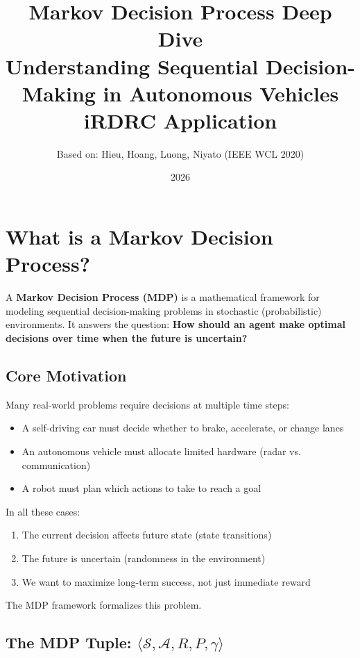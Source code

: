 \documentclass[12pt,a4paper]{article}
\title{\textbf{Markov Decision Process Deep Dive}\\
\large Understanding Sequential Decision-Making in Autonomous Vehicles\\
\normalsize iRDRC Application}
\author{Based on: Hieu, Hoang, Luong, Niyato (IEEE WCL 2020)}
\date{2026}
\begin{document}
\maketitle
\setcounter{tocdepth}{1}
\tableofcontents
\newpage

\section{What is a Markov Decision Process?}

A \textbf{Markov Decision Process (MDP)} is a mathematical framework for modeling sequential decision-making problems in stochastic (probabilistic) environments. It answers the question: \textbf{How should an agent make optimal decisions over time when the future is uncertain?}

\subsection{Core Motivation}

Many real-world problems require decisions at multiple time steps:
\begin{itemize}
    \item A self-driving car must decide whether to brake, accelerate, or change lanes
    \item An autonomous vehicle must allocate limited hardware (radar vs. communication)
    \item A robot must plan which actions to take to reach a goal
\end{itemize}

In all these cases:
\begin{enumerate}
    \item The current decision affects future state (state transitions)
    \item The future is uncertain (randomness in the environment)
    \item We want to maximize long-term success, not just immediate reward
\end{enumerate}

The MDP framework formalizes this problem.

\subsection{The MDP Tuple: $\langle \mathcal{S}, \mathcal{A}, R, P, \gamma \rangle$}
\end{document}
